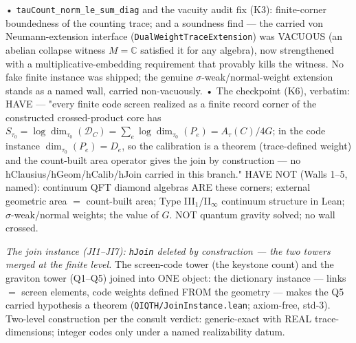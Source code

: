 \documentclass[11pt,a4paper]{article}
\begin{document}
  • \texttt{tauCount\_norm\_le\_sum\_diag} and the vacuity audit fix (K3): finite-corner boundedness of the counting trace; and a soundness find — the carried von Neumann-extension interface (\texttt{DualWeightTraceExtension}) was VACUOUS (an abelian collapse witness $M=\mathbb{C}$ satisfied it for any algebra), now strengthened with a multiplicative-embedding requirement that provably kills the witness. No fake finite instance was shipped; the genuine $\sigma$-weak/normal-weight extension stands as a named wall, carried non-vacuously.
  • The checkpoint (K6), verbatim: HAVE — "every finite code screen realized as a finite record corner of the constructed crossed-product core has $S_{\tau_0} = \log\dim_{\tau_0}(\mathcal{D}_C) = \sum_e \log\dim_{\tau_0}(P_e) = A_\tau(C)/4G$; in the code instance $\dim_{\tau_0}(P_e) = D_e$, so the calibration is a theorem (trace-defined weight) and the count-built area operator gives the join by construction — no hClausius/hGeom/hCalib/hJoin carried in this branch." HAVE NOT (Walls 1--5, named): continuum QFT diamond algebras ARE these corners; external geometric area $=$ count-built area; Type III$_1$/II$_\infty$ continuum structure in Lean; $\sigma$-weak/normal weights; the value of $G$. NOT quantum gravity solved; no wall crossed.

\emph{The join instance (JI1--JI7): \texttt{hJoin} deleted by construction — the two towers merged at the finite level.} The screen-code tower (the keystone count) and the graviton tower (Q1--Q5) joined into ONE object: the dictionary instance — links $=$ screen elements, code weights defined FROM the geometry — makes the Q5 carried hypothesis a theorem (\texttt{QIQTH/JoinInstance.lean}; axiom-free, std-3). Two-level construction per the consult verdict: generic-exact with REAL trace-dimensions; integer codes only under a named realizability datum.
\end{document}
